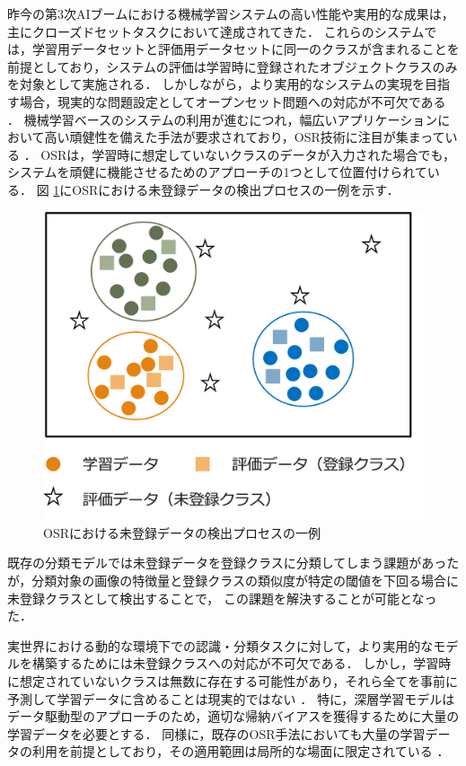 昨今の第3次AIブームにおける機械学習システムの高い性能や実用的な成果は，主にクローズドセットタスクにおいて達成されてきた．
これらのシステムでは，学習用データセットと評価用データセットに同一のクラスが含まれることを前提としており，システムの評価は学習時に登録されたオブジェクトクラスのみを対象として実施される．
しかしながら，より実用的なシステムの実現を目指す場合，現実的な問題設定としてオープンセット問題への対応が不可欠である \cite{geng2021survey}．
機械学習ベースのシステムの利用が進むにつれ，幅広いアプリケーションにおいて高い頑健性を備えた手法が要求されており，OSR技術に注目が集まっている \cite{sun2023survey}．
OSRは，学習時に想定していないクラスのデータが入力された場合でも，システムを頑健に機能させるためのアプローチの1つとして位置付けられている．
図 \ref{fig:osr}にOSRにおける未登録データの検出プロセスの一例を示す．
% 
\begin{figure}[tbp]
  \centering
  \includegraphics[width=0.6\linewidth, keepaspectratio]{image/osr.png}
  \caption{OSRにおける未登録データの検出プロセスの一例}
  \label{fig:osr}
\end{figure}
% 
既存の分類モデルでは未登録データを登録クラスに分類してしまう課題があったが，分類対象の画像の特徴量と登録クラスの類似度が特定の閾値を下回る場合に未登録クラスとして検出することで，
この課題を解決することが可能となった．

実世界における動的な環境下での認識・分類タスクに対して，より実用的なモデルを構築するためには未登録クラスへの対応が不可欠である．
しかし，学習時に想定されていないクラスは無数に存在する可能性があり，それら全てを事前に予測して学習データに含めることは現実的ではない \cite{mahdavi2021survey}．
特に，深層学習モデルはデータ駆動型のアプローチのため，適切な帰納バイアスを獲得するために大量の学習データを必要とする．
同様に，既存のOSR手法においても大量の学習データの利用を前提としており，その適用範囲は局所的な場面に限定されている \cite{wang2023}．

